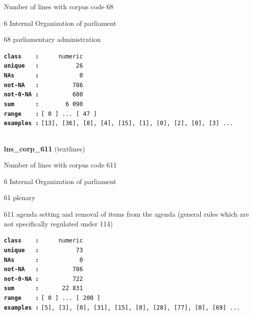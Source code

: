 \documentclass[]{article}
\begin{document}
Number of lines with corpus code 68

6 Internal Organization of parliament

68 parliamentary administration

\textbf{\texttt{class\ \ \ \ :}} \texttt{~~~~~numeric}\\
\textbf{\texttt{unique\ \ \ :}} \texttt{~~~~~~~~~~26}\\
\textbf{\texttt{NAs\ \ \ \ \ \ :}} \texttt{~~~~~~~~~~~0}\\
\textbf{\texttt{not-NA\ \ \ :}} \texttt{~~~~~~~~~786}\\
\textbf{\texttt{not-0-NA\ :}} \texttt{~~~~~~~~~600}\\
\textbf{\texttt{sum\ \ \ \ \ \ :}} \texttt{~~~~~~~6~090}\\
\textbf{\texttt{range\ \ \ \ :}}
\texttt{{[}\ 0\ {]}\ ...\ {[}\ 47\ {]}}\\
\textbf{\texttt{examples\ :}}
\texttt{{[}13{]},\ {[}36{]},\ {[}8{]},\ {[}4{]},\ {[}15{]},\ {[}1{]},\ {[}0{]},\ {[}2{]},\ {[}0{]},\ {[}3{]}\ ...}\\

~

\textbf{lns\_corp\_611} (textlines)

Number of lines with corpus code 611

6 Internal Organization of parliament

61 plenary

611 agenda setting and removal of items from the agenda (general rules
which are not specifically regulated under 114)

\textbf{\texttt{class\ \ \ \ :}} \texttt{~~~~~numeric}\\
\textbf{\texttt{unique\ \ \ :}} \texttt{~~~~~~~~~~73}\\
\textbf{\texttt{NAs\ \ \ \ \ \ :}} \texttt{~~~~~~~~~~~0}\\
\textbf{\texttt{not-NA\ \ \ :}} \texttt{~~~~~~~~~786}\\
\textbf{\texttt{not-0-NA\ :}} \texttt{~~~~~~~~~722}\\
\textbf{\texttt{sum\ \ \ \ \ \ :}} \texttt{~~~~~~22~831}\\
\textbf{\texttt{range\ \ \ \ :}}
\texttt{{[}\ 0\ {]}\ ...\ {[}\ 200\ {]}}\\
\textbf{\texttt{examples\ :}}
\texttt{{[}5{]},\ {[}3{]},\ {[}0{]},\ {[}31{]},\ {[}15{]},\ {[}0{]},\ {[}28{]},\ {[}77{]},\ {[}0{]},\ {[}69{]}\ ...}\\

~
\end{document}
